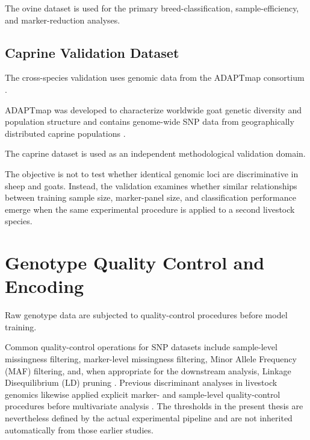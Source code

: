 
The ovine dataset is used for the primary breed-classification,
sample-efficiency, and marker-reduction analyses.


\subsection{Caprine Validation Dataset}
\label{subsec:adaptmap_dataset}

The cross-species validation uses genomic data from the ADAPTmap
consortium
\cite{stella2018adaptmap, colli2018genome}.

ADAPTmap was developed to characterize worldwide goat genetic
diversity and population structure and contains genome-wide SNP data
from geographically distributed caprine populations
\cite{stella2018adaptmap, colli2018genome}.

The caprine dataset is used as an independent methodological
validation domain.

The objective is not to test whether identical genomic loci are
discriminative in sheep and goats.
Instead, the validation examines whether similar relationships
between training sample size, marker-panel size, and
classification performance emerge when the same experimental
procedure is applied to a second livestock species.



\section{Genotype Quality Control and Encoding}
\label{sec:genotype_preprocessing}

Raw genotype data are subjected to quality-control procedures before
model training.

Common quality-control operations for SNP datasets include
sample-level missingness filtering, marker-level missingness
filtering, Minor Allele Frequency (MAF) filtering, and, when
appropriate for the downstream analysis, Linkage Disequilibrium
(LD) pruning
\cite{purcell2007plink, anderson2010data, chang2015second}.
Previous discriminant analyses in livestock genomics likewise
applied explicit marker- and sample-level quality-control procedures
before multivariate analysis
\cite{dimauro2013canonical, sorbolini2016signatures}.
The thresholds in the present thesis are nevertheless defined by the
actual experimental pipeline and are not inherited automatically
from those earlier studies.

